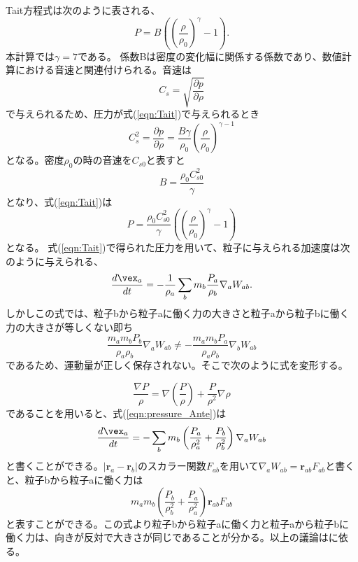 \documentclass[]{jsarticle}
\begin{document}
Tait方程式は次のように表される、
\begin{equation}
  \label{eqn:Tait}
  P=B\left(
 \left(\frac{\rho}{\rho_0}\right)^\gamma-1
    \right).
\end{equation}
本計算では$\gamma=7$である。
係数Bは密度の変化幅に関係する係数であり、数値計算における音速と関連付けられる。音速は
\begin{equation}
C_s=\sqrt{\frac{\partial p}{\partial \rho}}
\end{equation}
で与えられるため、圧力が式(\ref{eqn:Tait})で与えられるとき
\begin{equation}
C_s^2=\frac{\partial p}{\partial \rho}=\frac{B\gamma}{\rho_0}\left(\frac{\rho}{\rho_0}\right)^{\gamma -1}
\end{equation}
となる。密度$\rho_0$の時の音速を$C_{s0}$と表すと
\begin{equation}
B=\frac{\rho_0C_{s0}^2}{\gamma}
\end{equation}
となり、式(\ref{eqn:Tait})は
\begin{equation}
P=\frac{\rho_0C_{s0}^2}{\gamma}\left(\left(\frac{\rho}{\rho_0}\right)^\gamma-1\right)
\end{equation}
となる。
式(\ref{eqn:Tait})で得られた圧力を用いて、粒子に与えられる加速度は次のように与えられる、
\begin{equation}
  \label{eqn:pressure_Ante}
\frac{d\vex_a}{dt}=-\frac{1}{\rho_a}\sum_bm_b\frac{P_a}{\rho_b}\nabla_aW_{ab}.
\end{equation}
しかしこの式では、粒子bから粒子aに働く力の大きさと粒子aから粒子bに働く力の大きさが等しくない即ち
\begin{equation}
\frac{m_am_bP_b}{\rho_a\rho_b}\nabla_aW_{ab} \neq -\frac{m_am_bP_a}{\rho_a\rho_b}\nabla_bW_{ab}
\end{equation}
であるため、運動量が正しく保存されない。そこで次のように式を変形する。

\begin{equation}
\frac{\nabla P}{\rho}=\nabla \left(\frac{P}{\rho}\right)+\frac{P}{\rho^2}\nabla \rho
\end{equation}
であることを用いると、式(\ref{eqn:pressure_Ante})は
\begin{equation}
\frac{d\vex_a}{dt}=-\sum_bm_b\left(\frac{P_a}{\rho_a^2}+\frac{P_b}{\rho_b^2}\right)\nabla_aW_{ab}
\end{equation}
と書くことができる。$|\bm{r}_a-\bm{r}_b|$のスカラー関数$F_{ab}$を用いて$\nabla_aW_{ab}=\bm{r}_{ab}F_{ab}$と書くと、粒子bから粒子aに働く力は
\begin{equation}
m_am_b\left(\frac{P_b}{\rho_b^2}+\frac{P_a}{\rho_a^2}\right)\bm{r}_{ab}F_{ab}
\end{equation}
と表すことができる。この式より粒子bから粒子aに働く力と粒子aから粒子bに働く力は、向きが反対で大きさが同じであることが分かる。以上の議論は\cite{Monaghan2005}に依る。
\end{document}
